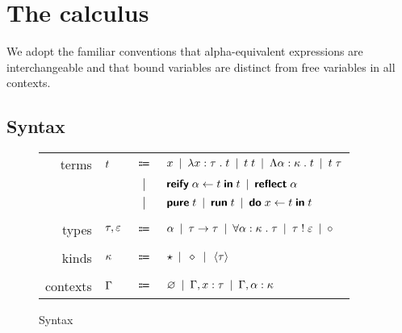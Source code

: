 \section{The calculus}

  We adopt the familiar conventions that alpha-equivalent expressions are interchangeable and that bound variables are distinct from free variables in all contexts.

  \subsection{Syntax}

    \begin{figure}[H]
      \begin{center}
        \begin{tabular}{r l c l}
          terms & $t$ & $\Coloneqq$ & $
            x                                           \enspace | \enspace
            \lambda x : \tau \; . \; t                      \enspace | \enspace
            t \; t                             \enspace | \enspace
            \Lambda \alpha : \kappa \; . \; t                     \enspace | \enspace
            t \; \tau                            $ \\
          & & $|$ & $
            \textsf{\textbf{reify}} \; \alpha \leftarrow t \; \textsf{\textbf{in}} \; t                    \enspace | \enspace
            \textsf{\textbf{reflect}} \; \alpha                                $ \\
          & & $|$ & $
            \textsf{\textbf{pure}} \; t                                   \enspace | \enspace
            \textsf{\textbf{run}} \; t                                    \enspace | \enspace
            \textsf{\textbf{do}} \; x \leftarrow t \; \textsf{\textbf{in}} \; t                       $ \\ \\
          types & $\tau, \varepsilon$ & $\Coloneqq$ & $
            \alpha                                           \enspace | \enspace
            \tau \rightarrow \tau                           \enspace | \enspace
            \forall \alpha : \kappa \; . \; \tau                   \enspace | \enspace
            \tau \; ! \; \varepsilon                   \enspace | \enspace
            \circ                                          $ \\ \\
          kinds & $\kappa$ & $\Coloneqq$ & $
            \star                                          \enspace | \enspace
            \diamond                                        \enspace | \enspace
            \left\langle \tau \right\rangle                                $ \\ \\
          contexts & $\Gamma$ & $\Coloneqq$ & $
            \varnothing                                         \enspace | \enspace
            \Gamma, x : \tau               \enspace | \enspace
            \Gamma, \alpha : \kappa               $
        \end{tabular}
      \end{center}

      \caption{Syntax}
      \label{fig:syntax}
    \end{figure}

